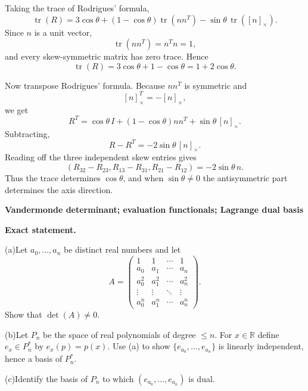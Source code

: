 \begin{solution}
Taking the trace of Rodrigues' formula,
\[
\operatorname{tr}(R)
=
3\cos\theta
+(1-\cos\theta)\operatorname{tr}(nn^T)
-\sin\theta\,\operatorname{tr}([n]_\times).
\]
Since \(n\) is a unit vector,
\[
\operatorname{tr}(nn^T)=n^Tn=1,
\]
and every skew-symmetric matrix has zero trace. Hence
\[
\operatorname{tr}(R)
=
3\cos\theta+1-\cos\theta
=
1+2\cos\theta.
\]

Now transpose Rodrigues' formula. Because \(nn^T\) is symmetric and
\[
[n]_\times^T=-[n]_\times,
\]
we get
\[
R^T
=
\cos\theta\,I
+(1-\cos\theta)nn^T
+\sin\theta\,[n]_\times.
\]
Subtracting,
\[
R-R^T=-2\sin\theta\,[n]_\times.
\]
Reading off the three independent skew entries gives
\[
(R_{32}-R_{23},R_{13}-R_{31},R_{21}-R_{12})
=
-2\sin\theta\,n.
\]
Thus the trace determines \(\cos\theta\), and when \(\sin\theta\neq0\) the antisymmetric part
determines the axis direction.
\end{solution}

\begin{problem}[CP-I-0103]
\label{prob:cp-i-0103}
\textbf{Vandermonde determinant; evaluation functionals; Lagrange dual basis}

\textbf{Exact statement.}

	\par\hspace*{1.5em} (a)\quad Let \(a_0,\dots,a_n\) be distinct real numbers and let
	\[
	A=\begin{pmatrix}
		1&1&\cdots&1\\
		a_0&a_1&\cdots&a_n\\
		a_0^2&a_1^2&\cdots&a_n^2\\
		\vdots&\vdots&\ddots&\vdots\\
		a_0^n&a_1^n&\cdots&a_n^n
	\end{pmatrix}.
	\]
	Show that \(\det(A)\neq 0\).
	\par\noindent (b)\quad Let \(P_n\) be the space of real polynomials of degree \(\le n\). For \(x\in\mathbb R\) define \(e_x\in P_n^*\) by
	\(e_x(p)=p(x)\). Use (a) to show \(\{e_{a_0},\dots,e_{a_n}\}\) is linearly independent, hence a basis of \(P_n^*\).
	\par\noindent (c)\quad Identify the basis of \(P_n\) to which \((e_{a_0},\dots,e_{a_n})\) is dual.

\end{problem}

